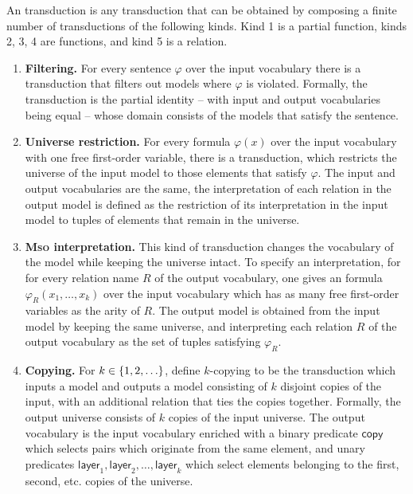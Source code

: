 \begin{definition}\label{def:mso-transduction}
    An \mso transduction is any transduction that can be obtained by composing a finite number of transductions of the following kinds.
Kind 1 is a partial function, kinds 2, 3, 4 are functions, and kind 5 is a relation.
\begin{enumerate}
	\item {\bf Filtering.} \label{mso-trans:filtering} For every \mso sentence $\varphi$ over the input vocabulary there is a transduction that filters out models where $\varphi$ is violated. Formally, the transduction is the partial identity -- with input and output vocabularies being equal --  whose domain consists of the models that satisfy the sentence. 
	\item {\bf Universe restriction.} For every \mso formula $\varphi(x)$ over the input vocabulary with one free first-order variable, there is a transduction, which restricts the universe of the input model to those elements that satisfy $\varphi$. The input and output vocabularies are the same, the interpretation of each relation in the output model is defined as the restriction of its interpretation 
	in the input model to tuples of elements that remain in the universe.
	\item {\bfseries{\scshape{Mso}} interpretation.} This kind of transduction changes the vocabulary of the model while keeping the universe intact. To specify an \mso interpretation, for for every relation name $R$ of the output vocabulary, one gives an \mso formula $\varphi_R(x_1,\ldots,x_k)$ over the input vocabulary which has as many free first-order variables as the arity of $R$. The output model is obtained from the input model by keeping the same universe, and interpreting each relation $R$ of the output vocabulary as the set of tuples  satisfying $\varphi_R$.
	\item {\bf Copying.} \label{mso-trans:copying} For  $k \in \{1,2,\ldots\}$, define $k$-copying to be the transduction which inputs a model and outputs a model consisting of $k$ disjoint copies of the input, with an additional relation that ties the copies together. Formally, the output universe consists of $k$ copies of the input universe.
	The output vocabulary is the input vocabulary enriched with a binary predicate $\mathsf{copy}$ which selects pairs which originate from the same element, and unary predicates $\mathsf{layer}_1,\mathsf{layer}_2,\ldots,\mathsf{layer}_k$ which select elements belonging to the first, second, etc. copies of the universe.

\end{enumerate}
\end{definition}
